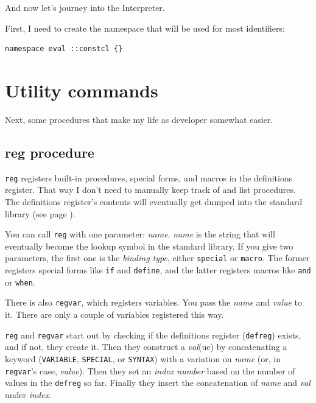 \documentclass[twoside,9pt]{report}
\begin{document}
And now let's journey into the Interpreter.


First, I need to create the namespace that will be used for most identifiers:

\begin{lstlisting}
namespace eval ::constcl {}
\end{lstlisting}
\section{Utility commands}
\label{utility-commands}


Next, some procedures that make my life as developer somewhat easier.

\subsection{reg procedure}
\label{reg-procedure}


\texttt{reg} registers built-in procedures, special forms, and macros in the definitions register. That way I don't need to manually keep track of and list procedures. The definitions register's contents will eventually get dumped into the standard library (see page \pageref{environment-startup}).


You can call \texttt{reg} with one parameter: \emph{name}. \emph{name} is the string that will eventually become the lookup symbol in the standard library. If you give two parameters, the first one is the \emph{binding type}, either \texttt{special} or \texttt{macro}. The former registers special forms like \texttt{if} and \texttt{define}, and the latter registers macros like \texttt{and} or \texttt{when}.


There is also \texttt{regvar}, which registers variables. You pass the \emph{name} and \emph{value} to it. There are only a couple of variables registered this way.


\texttt{reg} and \texttt{regvar} start out by checking if the definitions register (\texttt{defreg}) exists, and if not, they create it. Then they construct a \emph{val}(ue) by concatenating a keyword (\texttt{VARIABLE}, \texttt{SPECIAL}, or \texttt{SYNTAX}) with a variation on \emph{name} (or, in \texttt{regvar}'s case, \emph{value}). Then they set an \emph{index number} based on the number of values in the \texttt{defreg} so far. Finally they insert the concatenation of \emph{name} and \emph{val} under \emph{index}.
\end{document}
